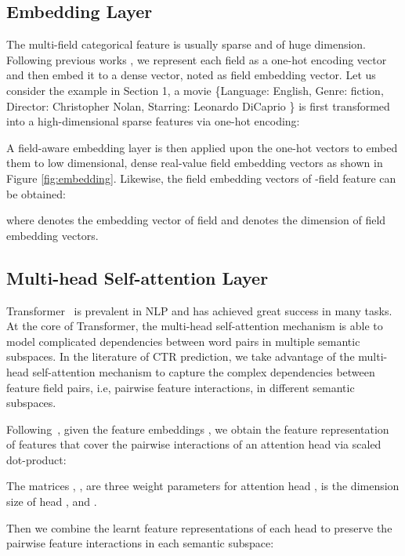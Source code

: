 \documentclass[sigconf]{acmart}
\begin{document}
\subsection{Embedding Layer} \label{sect:graph}
The multi-field categorical feature   is usually sparse and of huge dimension.
Following previous works \cite{zhang2016deep,qu2016product,wang2017deep,guo2017deepfm,qu2018product}, we represent each field as a one-hot encoding vector and then embed it to a dense vector, noted as field embedding vector.
Let us consider the example in Section 1, 
a movie \textsf{\{Language: English, Genre: fiction, Director: Christopher Nolan, Starring: Leonardo DiCaprio \}} is first transformed into a high-dimensional sparse features via one-hot encoding:
\begin{center}	

 \end{center}	
A field-aware embedding layer is then applied upon the one-hot vectors to embed them to low dimensional, dense real-value field embedding vectors as shown in Figure \ref{fig:embedding}.
Likewise, the field embedding vectors of -field feature can be obtained: 
\begin{center}	

\end{center}
where  denotes the embedding vector of field  and  denotes the dimension of field embedding vectors.

\subsection{Multi-head Self-attention Layer} 
Transformer~\cite{vaswani2017attention} is prevalent in NLP and has achieved great success in many tasks.
At the core of Transformer, the multi-head self-attention mechanism is able to model complicated dependencies between word pairs in multiple semantic subspaces.
In the literature of CTR prediction, we take advantage of the multi-head self-attention mechanism to capture the complex dependencies between feature field pairs, i.e, pairwise feature interactions, in different semantic subspaces.

Following~\cite{song2018autoint}, given the feature embeddings , we obtain the feature representation of features that cover the pairwise interactions of an attention head  via scaled dot-product:


The matrices , ,  are three weight parameters for attention head ,  is the dimension size of head , and .

Then we combine the learnt feature representations of each head to preserve the pairwise feature interactions in each semantic subspace:
\end{document}
